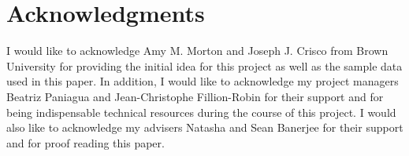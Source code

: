 \documentclass[12pt,twocolumn]{article}
\begin{document}
\section{Acknowledgments}

I would like to acknowledge Amy M. Morton and Joseph J. Crisco from Brown University for providing the initial
idea for this project as well as the sample data used in this paper. In addition, I would like to acknowledge 
my project managers Beatriz Paniagua and Jean-Christophe Fillion-Robin for their support and for being indispensable 
technical resources during the course of this project. I would also like to acknowledge my advisers 
Natasha and Sean Banerjee for their support and for proof reading this paper.





\end{document}
